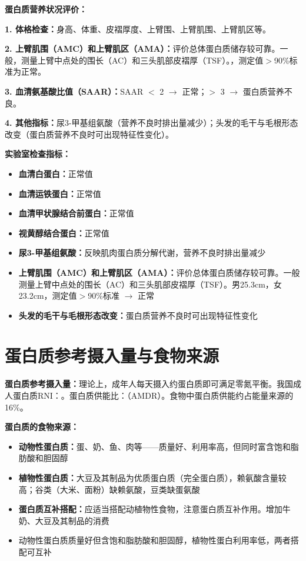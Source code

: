 \begin{keybox}
\textbf{蛋白质营养状况评价：}

\textbf{1. 体格检查：}身高、体重、皮褶厚度、上臂围、上臂肌围、上臂肌区等。

\textbf{2. 上臂肌围（AMC）和上臂肌区（AMA）：}评价总体蛋白质储存较可靠。一般，测量上臂中点处的围长（AC）和三头肌部皮褶厚（TSF）。，测定值$>$90\%标准为正常。

\textbf{3. 血清氨基酸比值（SAAR）：}SAAR $<$ 2 $\rightarrow$ 正常；$>$ 3 $\rightarrow$ 蛋白质营养不良。

\textbf{4. 其他指标：}尿3-甲基组氨酸（营养不良时排出量减少）；头发的毛干与毛根形态改变（蛋白质营养不良时可出现特征性变化）。
\end{keybox}

\begin{tipbox}
\textbf{实验室检查指标：}
\begin{itemize}[leftmargin=*]
    \item \textbf{血清白蛋白：}正常值
    \item \textbf{血清运铁蛋白：}正常值
    \item \textbf{血清甲状腺结合前蛋白：}正常值
    \item \textbf{视黄醇结合蛋白：}正常值
    \item \textbf{尿3-甲基组氨酸：}反映肌肉蛋白质分解代谢，营养不良时排出量减少
    \item \textbf{上臂肌围（AMC）和上臂肌区（AMA）：}评价总体蛋白质储存较可靠。一般测量上臂中点处的围长（AC）和三头肌部皮褶厚（TSF）。男25.3cm，女23.2cm，测定值$>$90\%标准 $\rightarrow$ 正常
    \item \textbf{头发的毛干与毛根形态改变：}蛋白质营养不良时可出现特征性变化
\end{itemize}
\end{tipbox}

\section{蛋白质参考摄入量与食物来源}

\begin{defbox}
\textbf{蛋白质参考摄入量：}理论上，成年人每天摄入约蛋白质即可满足零氮平衡。我国成人蛋白质RNI：。蛋白质供能比：（AMDR）。食物中蛋白质供能约占能量来源的16\%。 %

\textbf{蛋白质的食物来源：}
\begin{itemize}[leftmargin=*]
    \item \textbf{动物性蛋白质：}蛋、奶、鱼、肉等——质量好、利用率高，但同时富含饱和脂肪酸和胆固醇
    \item \textbf{植物性蛋白质：}大豆及其制品为优质蛋白质（完全蛋白质），赖氨酸含量较高；谷类（大米、面粉）缺赖氨酸，豆类缺蛋氨酸
    \item \textbf{蛋白质互补搭配：}应适当搭配动植物性食物，注意蛋白质互补作用。增加牛奶、大豆及其制品的消费
    \item 动物性蛋白质质量好但含饱和脂肪酸和胆固醇，植物性蛋白利用率低，两者搭配可互补
\end{itemize}
\end{defbox}

